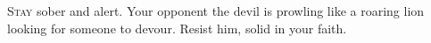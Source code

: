 \lettrine[loversize=0.15,lines=2]{S}{tay} sober and alert. Your opponent the devil is prowling like a roaring lion looking for someone to devour. Resist him, solid in your faith.
